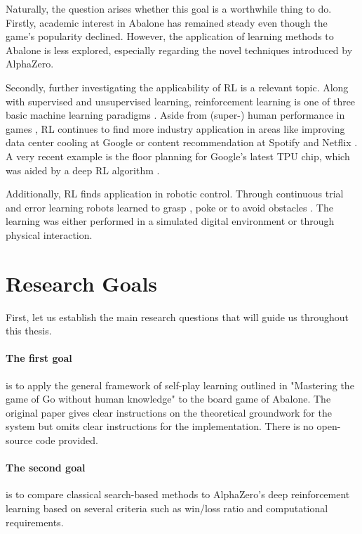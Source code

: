 Naturally, the question arises whether this goal is a worthwhile thing to do. Firstly, academic interest in Abalone has remained steady even though the game's popularity declined. However, the application of learning methods to Abalone is less explored, especially regarding the novel techniques introduced by AlphaZero.

Secondly, further investigating the applicability of RL is a relevant topic. Along with supervised and unsupervised learning, reinforcement learning is one of three basic machine learning paradigms \cite{noauthor_reinforcement_2022}. Aside from (super-) human performance in games \cite{mnih_human-level_2015, berner_dota_2019,vinyals_grandmaster_2019}, RL continues to find more industry application in areas like improving data center cooling at Google \cite{gamble_safety-first_2018} or content recommendation at Spotify \cite{jebara_for_2020} and Netflix \cite{siddiqi_ml_2019}. A very recent example is the floor planning for Google's latest TPU chip, which was aided by a deep RL algorithm \cite{mirhoseini_graph_2021}.

Additionally, RL finds application in robotic control. Through continuous trial and error learning robots learned to grasp \cite{pinto_supersizing_2016,zeng_learning_2018}, poke \cite{agrawal_learning_nodate} or to avoid obstacles \cite{kahn_uncertainty-aware_2017}. The learning was either performed in a simulated digital environment or through physical interaction.

\section{Research Goals}
First, let us establish the main research questions that will guide us throughout this thesis.

\paragraph{The first goal} is to apply the general framework of self-play learning outlined in "Mastering the game of Go without human knowledge" to the board game of Abalone. \cite{silver_mastering_2017} The original paper gives clear instructions on the theoretical groundwork for the system but omits clear instructions for the implementation. There is no open-source code provided.

\paragraph{The second goal} is to compare classical search-based methods to AlphaZero's deep reinforcement learning based on several criteria such as win/loss ratio and computational requirements.


